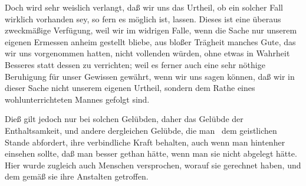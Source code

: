 \begin{aufza}
\item Doch wird sehr weislich verlangt, daß wir uns das Urtheil, ob ein solcher Fall wirklich vorhanden sey, so fern es möglich ist,  lassen. Dieses ist eine überaus zweckmäßige Verfügung, weil wir im widrigen Falle, wenn die Sache nur unserem eigenen Ermessen anheim gestellt bliebe, aus bloßer Trägheit manches Gute, das wir uns vorgenommen hatten, nicht vollenden würden, ohne etwas in Wahrheit Besseres statt dessen zu verrichten; weil es ferner auch eine sehr nöthige Beruhigung für unser Gewissen gewährt, wenn wir uns sagen können, daß wir in dieser Sache nicht unserem eigenen Urtheil, sondern dem Rathe eines wohlunterrichteten Mannes gefolgt sind.
\end{aufza}
\begin{RWanm} Dieß gilt jedoch nur bei solchen Gelübden,  daher das Gelübde der Enthaltsamkeit, und andere dergleichen Gelübde, die man \zB\  dem geistlichen Stande abfordert, ihre verbindliche Kraft behalten, auch wenn man hintenher einsehen sollte, daß man besser gethan hätte, wenn man sie nicht abgelegt hätte. Hier wurde zugleich auch Menschen versprochen, worauf sie gerechnet haben, und dem gemäß sie ihre Anstalten getroffen. 
\end{RWanm}

